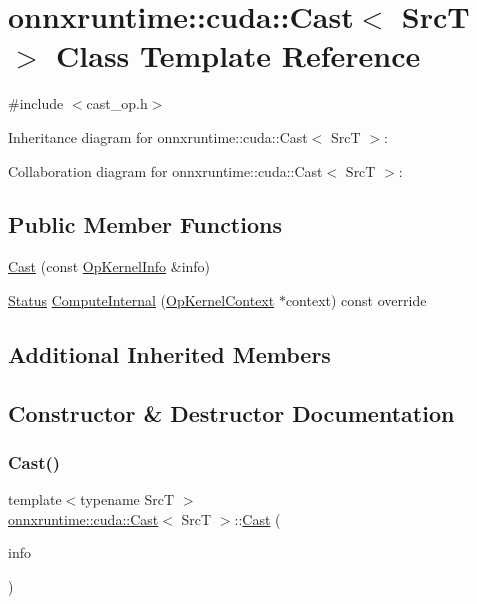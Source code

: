 \hypertarget{classonnxruntime_1_1cuda_1_1Cast}{}\section{onnxruntime\+:\+:cuda\+:\+:Cast$<$ SrcT $>$ Class Template Reference}
\label{classonnxruntime_1_1cuda_1_1Cast}


{\ttfamily \#include $<$cast\+\_\+op.\+h$>$}



Inheritance diagram for onnxruntime\+:\+:cuda\+:\+:Cast$<$ SrcT $>$\+:


Collaboration diagram for onnxruntime\+:\+:cuda\+:\+:Cast$<$ SrcT $>$\+:
\subsection*{Public Member Functions}
\begin{DoxyCompactItemize}
\item 
\mbox{\hyperlink{classonnxruntime_1_1cuda_1_1Cast_a9a977d99af9a8fef45601bb254f556d6}{Cast}} (const \mbox{\hyperlink{classonnxruntime_1_1OpKernelInfo}{Op\+Kernel\+Info}} \&info)
\item 
\mbox{\hyperlink{classonnxruntime_1_1common_1_1Status}{Status}} \mbox{\hyperlink{classonnxruntime_1_1cuda_1_1Cast_a3f827c1fa734b18897b0b06c53161efd}{Compute\+Internal}} (\mbox{\hyperlink{classonnxruntime_1_1OpKernelContext}{Op\+Kernel\+Context}} $\ast$context) const override
\end{DoxyCompactItemize}
\subsection*{Additional Inherited Members}


\subsection{Constructor \& Destructor Documentation}
\mbox{\label{classonnxruntime_1_1cuda_1_1Cast_a9a977d99af9a8fef45601bb254f556d6}} 
\subsubsection{\texorpdfstring{Cast()}{Cast()}}
{\footnotesize\ttfamily template$<$typename SrcT $>$ \\
\mbox{\hyperlink{classonnxruntime_1_1cuda_1_1Cast}{onnxruntime\+::cuda\+::\+Cast}}$<$ SrcT $>$\+::\mbox{\hyperlink{classonnxruntime_1_1cuda_1_1Cast}{Cast}} (\begin{DoxyParamCaption}\item[{const \mbox{\hyperlink{classonnxruntime_1_1OpKernelInfo}{Op\+Kernel\+Info}} \&}]{info }\end{DoxyParamCaption})\hspace{0.3cm}{\ttfamily [inline]}}



